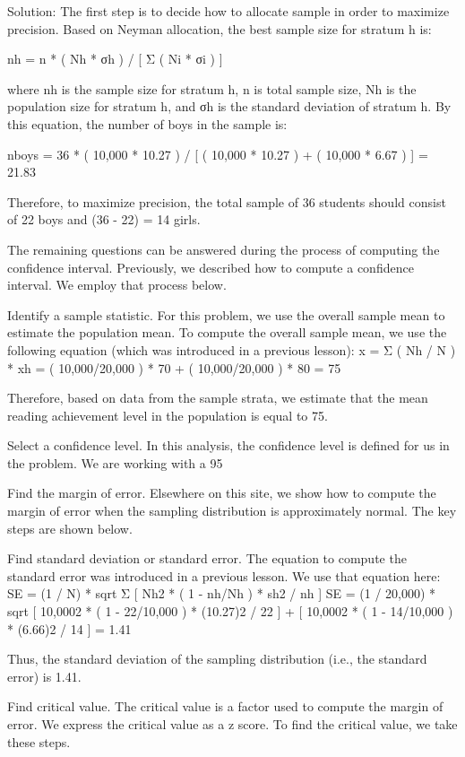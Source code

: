 Solution: The first step is to decide how to allocate sample in order to maximize precision. Based on Neyman allocation, the best sample size for stratum h is:

nh = n * ( Nh * σh ) / [ Σ ( Ni * σi ) ]

where nh is the sample size for stratum h, n is total sample size, Nh is the population size for stratum h, and σh is the standard deviation of stratum h. By this equation, the number of boys in the sample is:

nboys = 36 * ( 10,000 * 10.27 ) / [ ( 10,000 * 10.27 ) + ( 10,000 * 6.67 ) ] = 21.83

Therefore, to maximize precision, the total sample of 36 students should consist of 22 boys and (36 - 22) = 14 girls.

The remaining questions can be answered during the process of computing the confidence interval. Previously, we described how to compute a confidence interval. We employ that process below.

Identify a sample statistic. For this problem, we use the overall sample mean to estimate the population mean. To compute the overall sample mean, we use the following equation (which was introduced in a previous lesson):
x = Σ ( Nh / N ) * xh = ( 10,000/20,000 ) * 70 + ( 10,000/20,000 ) * 80 = 75

Therefore, based on data from the sample strata, we estimate that the mean reading achievement level in the population is equal to 75.

Select a confidence level. In this analysis, the confidence level is defined for us in the problem. We are working with a 95%

Find the margin of error. Elsewhere on this site, we show how to compute the margin of error when the sampling distribution is approximately normal. The key steps are shown below.

Find standard deviation or standard error. The equation to compute the standard error was introduced in a previous lesson. We use that equation here:
SE = (1 / N) * sqrt { Σ [ Nh2 * ( 1 - nh/Nh ) * sh2 / nh ] } 
SE = (1 / 20,000) * sqrt { [ 10,0002 * ( 1 - 22/10,000 ) * (10.27)2 / 22 ] + [ 10,0002 * ( 1 - 14/10,000 ) * (6.66)2 / 14 ] } = 1.41

Thus, the standard deviation of the sampling distribution (i.e., the standard error) is 1.41.

Find critical value. The critical value is a factor used to compute the margin of error. We express the critical value as a z score. To find the critical value, we take these steps.

